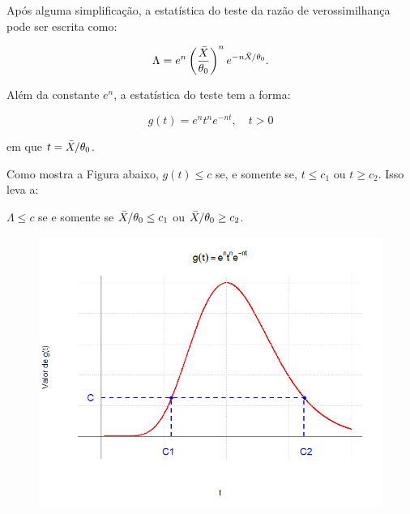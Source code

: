 \documentclass[12pt]{beamer}
\begin{document}
\begin{frame}{}
\begin{block}{}
\justifying
Após alguma simplificação, a estatística do teste da razão de verossimilhança pode ser escrita como:

\[
\Lambda = e^n\left(\dfrac{\Bar{X}}{\theta_0}\right)^{n}e^{-n\Bar{X}/\theta_{0}}.
\]

Além da constante $e^n$, a estatística do teste tem a forma:

\[
g(t) = e^{n}t^n e^{-nt}, \quad t > 0
\]

em que $t = \Bar{X}/\theta_0$.
\end{block}
\end{frame}

\begin{frame}{}
\begin{block}{}
\justifying
Como mostra a Figura abaixo, $g(t) \leq c$ se, e somente se, $t \leq c_1$ ou $t \geq c_2$. Isso leva a:

$\Lambda \leq c$ se e somente se $\Bar{X}/\theta_0 \leq c_1$ ou $\Bar{X}/\theta_0 \geq c_2$.
\end{block}
\begin{block}{}
\begin{figure}
    \centering
    \includegraphics[scale=0.4]{figs/g_t.png}
    \label{fig:enter-label}
\end{figure}

\end{block}
\end{frame}
\end{document}
